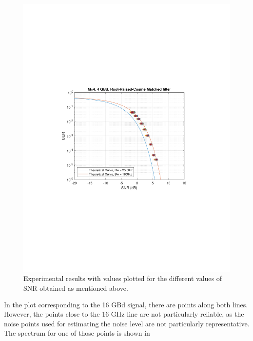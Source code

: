\begin{refsection}
\begin{figure}[H]
\begin{minipage}{0.43\textwidth}
		\includegraphics[clip, trim=4cm 8cm 4cm 8cm, 
		width=1\textwidth]{./sdf/m_qam_system/figures/snr/snrVsBer/4GBdAllSnrVsBER.pdf}
		\subcaption{\label{fig:snrAbsDev_16_2500}}
	\end{minipage}
	\caption{Experimental results with values plotted for the different values 
	of SNR obtained as mentioned above.\label{fig:berVsSnr_16_tri30}}
\end{figure}

In the plot corresponding to the 16 GBd signal, there are points along both 
lines. However, the points close to the 16 GHz line are not particularly 
reliable, as the noise points used for estimating the noise level are not 
particularly representative. The spectrum for one of those points is shown in 

\begin{figure}[H]
	\centering


\end{figure}
\end{refsection}
